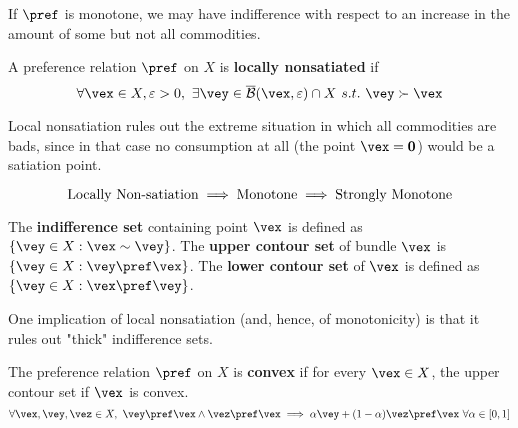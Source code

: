 \documentclass{article}
\begin{document}
 			\begin{remark}
 				If $\pref$ is monotone, we may have indifference with respect to an increase in the amount of some but not all commodities.
 			\end{remark}
 			
 			\begin{definition}[3.B.3]
 				A preference relation $\pref$ on $X$ is \textbf{locally nonsatiated} if
 				\begin{equation}
 					\forall \vex \in X, \varepsilon > 0,\ \exists \vey \in \overline{\mc{B}}(\vex, \varepsilon) \cap X\ s.t.\ \vey \succ \vex
 				\end{equation}
 			\end{definition}
 			
 			\begin{remark}
 				Local nonsatiation rules out the extreme situation in which all commodities are bads, since in that case no consumption at all (the point $\vex = \ve{0}$) would be a satiation point.
 			\end{remark}
 			
 			\begin{proposition}
 				\begin{equation}
 					\text{{Locally Non-satiation}} \implies \text{{Monotone}} \implies \text{{Strongly Monotone}}
 				\end{equation}
 			\end{proposition}
 			
 			\begin{definition}
 				The \textbf{indifference set} containing point $\vex$ is defined as $\{\vey \in X: \vex \sim \vey \}$. The \textbf{upper contour set} of bundle $\vex$ is $\{\vey \in X: \vey \pref \vex\}$. The \textbf{lower contour set} of $\vex$ is defined as $\{\vey \in X: \vex \pref \vey\}$.
 			\end{definition}
 			
 			\begin{remark}
 				One implication of local nonsatiation (and, hence, of monotonicity) is that it rules out "thick" indifference sets.
 			\end{remark}
 			
 			\begin{definition}[3.B.4]
 				The preference relation $\pref$ on $X$ is \textbf{convex} if for every $\vex \in X$, the upper contour set if $\vex$ is convex.
 				\begin{equation}
 					\forall \vex, \vey, \vez \in X,\ \vey \pref \vex \land \vez \pref \vex \implies \alpha \vey + (1-\alpha) \vez \pref \vex\ \forall \alpha \in [0, 1]
 				\end{equation}
 			\end{definition}
 			
\end{document}
